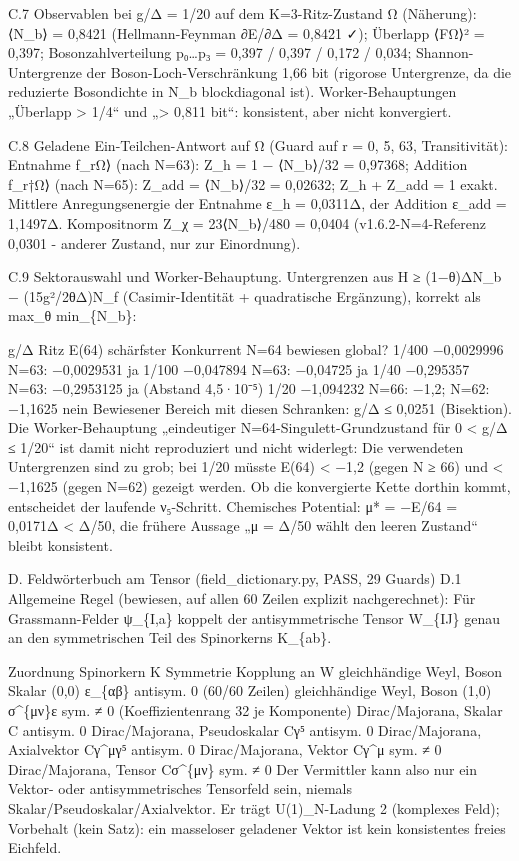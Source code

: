 C.7 Observablen bei g/Δ = 1/20 auf dem K=3-Ritz-Zustand Ω (Näherung):
⟨N\_b⟩ = 0,8421 (Hellmann-Feynman ∂E/∂Δ = 0,8421 ✓); Überlapp
\textbar⟨F\textbar Ω⟩\textbar² = 0,397; Bosonzahlverteilung p₀\ldots p₃
= 0,397 / 0,397 / 0,172 / 0,034; Shannon-Untergrenze der
Boson-Loch-Verschränkung 1,66 bit (rigorose Untergrenze, da die
reduzierte Bosondichte in N\_b blockdiagonal ist). Worker-Behauptungen
„Überlapp \textgreater{} 1/4`` und „\textgreater{} 0,811 bit``:
konsistent, aber nicht konvergiert.

C.8 Geladene Ein-Teilchen-Antwort auf Ω (Guard auf r = 0, 5, 63,
Transitivität): Entnahme f\_r\textbar Ω⟩ (nach N=63): Z\_h = 1 −
⟨N\_b⟩/32 = 0,97368; Addition f\_r†\textbar Ω⟩ (nach N=65): Z\_add =
⟨N\_b⟩/32 = 0,02632; Z\_h + Z\_add = 1 exakt. Mittlere Anregungsenergie
der Entnahme ε\_h = 0,0311Δ, der Addition ε\_add = 1,1497Δ. Kompositnorm
Z\_χ = 23⟨N\_b⟩/480 = 0,0404 (v1.6.2-N=4-Referenz 0,0301 - anderer
Zustand, nur zur Einordnung).

C.9 Sektorauswahl und Worker-Behauptung. Untergrenzen aus H ≥ (1−θ)ΔN\_b
− (15g²/2θΔ)N\_f (Casimir-Identität + quadratische Ergänzung), korrekt
als max\_θ min\_\{N\_b\}:

g/Δ Ritz E(64) schärfster Konkurrent N=64 bewiesen global? 1/400
−0,0029996 N=63: −0,0029531 ja 1/100 −0,047894 N=63: −0,04725 ja 1/40
−0,295357 N=63: −0,2953125 ja (Abstand 4,5·10⁻⁵) 1/20 −1,094232 N=66:
−1,2; N=62: −1,1625 nein Bewiesener Bereich mit diesen Schranken: g/Δ ≤
0,0251 (Bisektion). Die Worker-Behauptung „eindeutiger
N=64-Singulett-Grundzustand für 0 \textless{} \textbar g\textbar/Δ ≤
1/20`` ist damit nicht reproduziert und nicht widerlegt: Die verwendeten
Untergrenzen sind zu grob; bei 1/20 müsste E(64) \textless{} −1,2 (gegen
N ≥ 66) und \textless{} −1,1625 (gegen N=62) gezeigt werden. Ob die
konvergierte Kette dorthin kommt, entscheidet der laufende ν₅-Schritt.
Chemisches Potential: μ* = −E/64 = 0,0171Δ \textless{} Δ/50, die frühere
Aussage „μ = Δ/50 wählt den leeren Zustand`` bleibt konsistent.

D. Feldwörterbuch am Tensor (field\_dictionary.py, PASS, 29 Guards) D.1
Allgemeine Regel (bewiesen, auf allen 60 Zeilen explizit nachgerechnet):
Für Grassmann-Felder ψ\_\{I,a\} koppelt der antisymmetrische Tensor
W\_\{IJ\} genau an den symmetrischen Teil des Spinorkerns K\_\{ab\}.

Zuordnung Spinorkern K Symmetrie Kopplung an W gleichhändige Weyl, Boson
Skalar (0,0) ε\_\{αβ\} antisym. 0 (60/60 Zeilen) gleichhändige Weyl,
Boson (1,0) σ\^{}\{μν\}ε sym. ≠ 0 (Koeffizientenrang 32 je Komponente)
Dirac/Majorana, Skalar C antisym. 0 Dirac/Majorana, Pseudoskalar Cγ⁵
antisym. 0 Dirac/Majorana, Axialvektor Cγ\^{}μγ⁵ antisym. 0
Dirac/Majorana, Vektor Cγ\^{}μ sym. ≠ 0 Dirac/Majorana, Tensor
Cσ\^{}\{μν\} sym. ≠ 0 Der Vermittler kann also nur ein Vektor- oder
antisymmetrisches Tensorfeld sein, niemals
Skalar/Pseudoskalar/Axialvektor. Er trägt U(1)\_N-Ladung 2 (komplexes
Feld); Vorbehalt (kein Satz): ein masseloser geladener Vektor ist kein
konsistentes freies Eichfeld.

